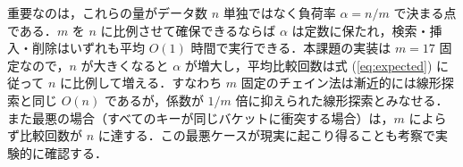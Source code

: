 重要なのは，これらの量がデータ数 $n$ 単独ではなく負荷率 $\alpha = n/m$ で決まる点である．$m$ を $n$ に比例させて確保できるならば $\alpha$ は定数に保たれ，検索・挿入・削除はいずれも平均 $O(1)$ 時間で実行できる．本課題の実装は $m = 17$ 固定なので，$n$ が大きくなると $\alpha$ が増大し，平均比較回数は式 (\ref{eq:expected}) に従って $n$ に比例して増える．すなわち $m$ 固定のチェイン法は漸近的には線形探索と同じ $O(n)$ であるが，係数が $1/m$ 倍に抑えられた線形探索とみなせる．また最悪の場合（すべてのキーが同じバケットに衝突する場合）は，$m$ によらず比較回数が $n$ に達する．この最悪ケースが現実に起こり得ることも考察で実験的に確認する．
